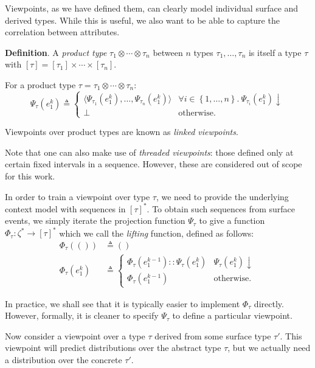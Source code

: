 \documentclass[12pt,a4paper,twoside,openright]{report}
\newcommand{\set}[1]{ \left\{ #1 \right\} }
\begin{document}
Viewpoints, as we have defined them, can clearly model individual surface and
derived types. While this is useful, we also want to be able to capture the
correlation between attributes.

\textbf{Definition}. A \emph{product type} $\tau_1 \otimes \cdots \otimes
\tau_n$ between $n$ types $\tau_1, \ldots, \tau_n$ is itself a type $\tau$ with
$[\tau] = [\tau_1] \times \cdots \times [\tau_n]$. 

For a product type $\tau = \tau_1 \otimes \cdots \otimes \tau_n$:
$$ \Psi_\tau(e_1^k) \triangleq
\begin{cases}
  \langle\Psi_{\tau_1}(e_1^k), \ldots, \Psi_{\tau_n}(e_1^k)\rangle & \forall i
  \in \set{1,\ldots,n}.\
  \Psi_{\tau_i}(e_1^k)\downarrow \\
  \bot & \text{otherwise.}
\end{cases}
$$

Viewpoints over product types are known as \emph{linked viewpoints}. 

Note that one can also make use of \emph{threaded viewpoints}: those defined
only at certain fixed intervals in a sequence. However, these are considered out
of scope for this work.

In order to train a viewpoint over type $\tau$, we need to provide the
underlying context model with sequences in $[\tau]^*$. To obtain such sequences
from surface events, we simply iterate the projection function $\Psi_\tau$ to
give a function $\Phi_\tau : \zeta^* \rightarrow [\tau]^*$ which we call the
\emph{lifting} function, defined as follows:
\begin{align*}
  \Phi_\tau(()) &\triangleq () \\
  \Phi_\tau(e_1^k) &\triangleq \begin{cases}
    \Phi_\tau(e_1^{k-1})::\Psi_\tau(e_1^k) & \Psi_\tau(e_1^k)\downarrow \\
    \Phi_\tau(e_1^{k-1}) & \text{otherwise.}
  \end{cases}
\end{align*}

In practice, we shall see that it is typically easier to implement $\Phi_\tau$
directly. However, formally, it is cleaner to specify $\Psi_\tau$ to define a
particular viewpoint.

Now consider a viewpoint over a type $\tau$ derived from some surface type
$\tau'$. This viewpoint will predict distributions over the abstract type
$\tau$, but we actually need a distribution over the concrete $\tau'$. 
\end{document}
